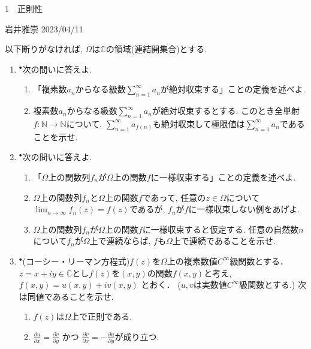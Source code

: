 \documentclass[dvipdfmx,a4paper,11pt]{article}
\newcommand{\N}{\mathbb{N}}
\newcommand{\C}{\mathbb{C}}
\theoremstyle{definition}
\newcommand{\pdrv}[2]{\frac{\partial #1}{\partial #2}}
\begin{document}

\begin{center}
{\Large 1　正則性}
\end{center}

\begin{flushright}
 岩井雅崇 2023/04/11
\end{flushright}
以下断りがなければ, $\Omega$は$\C$の領域(連結開集合)とする.

\begin{enumerate}[label=\textbf{問}1.\arabic*]

\item$^{\bullet}$次の問いに答えよ.
\begin{enumerate}
    \setlength{\parskip}{0cm} 
  \setlength{\itemsep}{0cm} 
  \item 「複素数$a_n$からなる級数$\sum_{n=1}^{\infty} a_n$が絶対収束する」ことの定義を述べよ.
  \item 複素数$a_n$からなる級数$\sum_{n=1}^{\infty}  a_n$が絶対収束するとする. このとき全単射$f : \N \rightarrow \N$について, $\sum_{n=1}^{\infty}  a_{f(n)} $も絶対収束して極限値は$\sum_{n=1}^{\infty}  a_n$であることを示せ.
\end{enumerate}

\item$^{\bullet}$次の問いに答えよ.
\begin{enumerate}
\setlength{\parskip}{0cm} 
  \setlength{\itemsep}{0cm} 
  \item 「$\Omega$上の関数列$f_{n}$が$\Omega$上の関数$f$に一様収束する」ことの定義を述べよ. 
  \item $\Omega$上の関数列$f_{n}$と$\Omega$上の関数$f$であって, 任意の$z \in \Omega$について$\lim_{n \rightarrow \infty} f_n(z) =f(z)$であるが, $f_{n}$が$f$に一様収束しない例をあげよ. 
  \item $\Omega$上の関数列$f_{n}$が$\Omega$上の関数$f$に一様収束すると仮定する. 任意の自然数$n$について$f_{n}$が$\Omega$上で連続ならば, $f$も$\Omega$上で連続であることを示せ.
      \end{enumerate}


\item $^{\bullet}$(コーシー・リーマン方程式)$f(z)$を$\Omega$上の複素数値$C^{\infty}$級関数とする．
$z = x + iy \in \C$とし$f(z)$を$(x,y)$の関数$f(x,y)$と考え, 
$
f(x,y) = u(x,y) + i v(x,y)
$
とおく． ($u,v$は実数値$C^{\infty}$級関数とする.)
次は同値であることを示せ.
\begin{enumerate}
    \setlength{\parskip}{0cm} 
  \setlength{\itemsep}{0cm} 
  \item $f(z)$は$\Omega$上で正則である.
  \item $\pdrv{u}{x} = \pdrv{v}{y}$ かつ $\pdrv{v}{x} = - \pdrv{u}{y}$が成り立つ.
\end{enumerate}



\end{enumerate}
\end{document}
